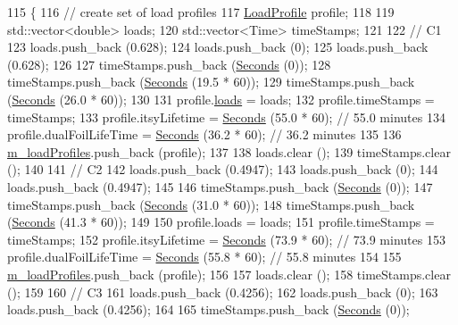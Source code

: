\begin{DoxyCode}
115 \{
116   \textcolor{comment}{// create set of load profiles}
117   \hyperlink{classBatteryLifetimeTest_a0a7dbe56f76bd35b61e1c8477c07d42d}{LoadProfile} profile;
118 
119   std::vector<double> loads;
120   std::vector<Time> timeStamps;
121 
122   \textcolor{comment}{// C1}
123   loads.push\_back (0.628);
124   loads.push\_back (0);
125   loads.push\_back (0.628);
126 
127   timeStamps.push\_back (\hyperlink{group__timecivil_ga33c34b816f8ff6628e33d5c8e9713b9e}{Seconds} (0));
128   timeStamps.push\_back (\hyperlink{group__timecivil_ga33c34b816f8ff6628e33d5c8e9713b9e}{Seconds} (19.5 * 60));
129   timeStamps.push\_back (\hyperlink{group__timecivil_ga33c34b816f8ff6628e33d5c8e9713b9e}{Seconds} (26.0 * 60));
130 
131   profile.\hyperlink{structBatteryLifetimeTest_1_1LoadProfile_a2e05ba4feddee725b7282b2d9e5291fc}{loads} = loads;
132   profile.timeStamps = timeStamps;
133   profile.itsyLifetime = \hyperlink{group__timecivil_ga33c34b816f8ff6628e33d5c8e9713b9e}{Seconds} (55.0 * 60);     \textcolor{comment}{// 55.0 minutes}
134   profile.dualFoilLifeTime = \hyperlink{group__timecivil_ga33c34b816f8ff6628e33d5c8e9713b9e}{Seconds} (36.2 * 60); \textcolor{comment}{// 36.2 minutes}
135 
136   \hyperlink{classBatteryLifetimeTest_aee9ad324da18f58ee75689778580c3fb}{m\_loadProfiles}.push\_back (profile);
137 
138   loads.clear ();
139   timeStamps.clear ();
140 
141   \textcolor{comment}{// C2}
142   loads.push\_back (0.4947);
143   loads.push\_back (0);
144   loads.push\_back (0.4947);
145 
146   timeStamps.push\_back (\hyperlink{group__timecivil_ga33c34b816f8ff6628e33d5c8e9713b9e}{Seconds} (0));
147   timeStamps.push\_back (\hyperlink{group__timecivil_ga33c34b816f8ff6628e33d5c8e9713b9e}{Seconds} (31.0 * 60));
148   timeStamps.push\_back (\hyperlink{group__timecivil_ga33c34b816f8ff6628e33d5c8e9713b9e}{Seconds} (41.3 * 60));
149 
150   profile.loads = loads;
151   profile.timeStamps = timeStamps;
152   profile.itsyLifetime = \hyperlink{group__timecivil_ga33c34b816f8ff6628e33d5c8e9713b9e}{Seconds} (73.9 * 60);     \textcolor{comment}{// 73.9 minutes}
153   profile.dualFoilLifeTime = \hyperlink{group__timecivil_ga33c34b816f8ff6628e33d5c8e9713b9e}{Seconds} (55.8 * 60); \textcolor{comment}{// 55.8 minutes}
154 
155   \hyperlink{classBatteryLifetimeTest_aee9ad324da18f58ee75689778580c3fb}{m\_loadProfiles}.push\_back (profile);
156 
157   loads.clear ();
158   timeStamps.clear ();
159 
160   \textcolor{comment}{// C3}
161   loads.push\_back (0.4256);
162   loads.push\_back (0);
163   loads.push\_back (0.4256);
164 
165   timeStamps.push\_back (\hyperlink{group__timecivil_ga33c34b816f8ff6628e33d5c8e9713b9e}{Seconds} (0));

\end{DoxyCode}
